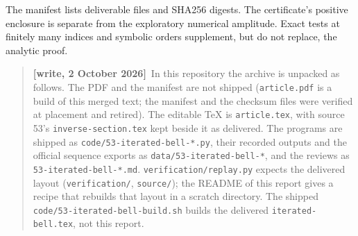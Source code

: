 \documentclass[11pt,letterpaper]{article}
\theoremstyle{remark}\newtheorem{remark}[theorem]{Remark}
\newenvironment{writenote}{\par\smallskip\begin{quote}\small\textbf{[write, 2 October 2026]}\ }{\end{quote}\smallskip}
\begin{document}
The manifest lists deliverable files and SHA256 digests. The certificate's positive enclosure is separate from the exploratory numerical amplitude. Exact tests at finitely many indices and symbolic orders supplement, but do not replace, the analytic proof.
\begin{writenote}In this repository the archive is unpacked as follows. The PDF and the manifest are not shipped (\texttt{article.pdf} is a build of this merged text; the manifest and the checksum files were verified at placement and retired). The editable TeX is \texttt{article.tex}, with source 53's \texttt{inverse-section.tex} kept beside it as delivered. The programs are shipped as \texttt{code/53-iterated-bell-*.py}, their recorded outputs and the official sequence exports as \texttt{data/53-iterated-bell-*}, and the reviews as \texttt{53-iterated-bell-*.md}. \texttt{verification/replay.py} expects the delivered layout (\texttt{verification/}, \texttt{source/}); the README of this report gives a recipe that rebuilds that layout in a scratch directory. The shipped \texttt{code/53-iterated-bell-build.sh} builds the delivered \texttt{iterated-bell.tex}, not this report.\end{writenote}

\clearpage
\end{document}
